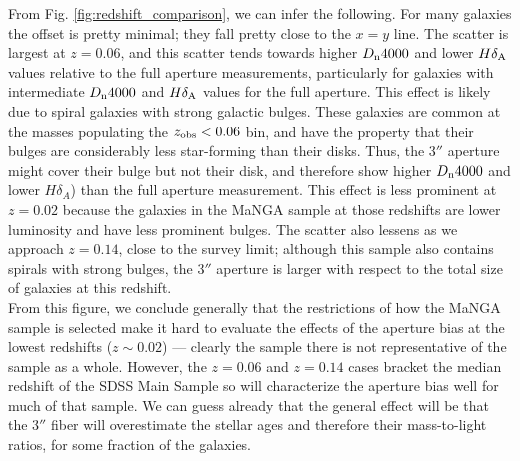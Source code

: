 From Fig. \ref{fig:redshift_comparison}, we can infer the following. For 
many galaxies the offset is pretty minimal; they fall pretty close 
to the $x=y$ line. The scatter is largest at $z = 0.06$, and this scatter
tends towards higher $D_{\rm n}4000$ and lower $H\delta_{\rm A}$ values 
relative to the full aperture measurements, particularly for galaxies with
intermediate $D_{\rm n}4000$ and $H\delta_{\rm A}$ values for the full
aperture. This effect is likely due to spiral galaxies with strong galactic
bulges. These galaxies are common at the masses populating the $z_{\rm obs} < 0.06$
bin, and have the property that their bulges are considerably less star-forming
than their disks. Thus, the 3$''$ aperture might cover their bulge but not their
disk, and therefore show higher $D_{\rm n} 4000$ and lower $H\delta_{A}$) than
the full aperture measurement. This effect is less prominent at $z=0.02$ because
the galaxies in the MaNGA sample at those redshifts are lower luminosity and 
have less prominent bulges. The scatter also lessens as we approach $z = 0.14$, 
close to the survey limit; although this sample also contains spirals with
strong bulges,  the 3$''$ aperture is larger with respect to the total size
of galaxies at this redshift.\\

From this figure, we conclude generally that the restrictions of
how the MaNGA sample is selected make it hard to evaluate the effects 
of the aperture bias at the lowest redshifts ($z\sim 0.02$) --- 
clearly the sample there is not representative of the sample as a whole.
However, the $z=0.06$ and $z=0.14$ cases bracket the median redshift of the 
SDSS Main Sample so will characterize the aperture bias well for much
of that sample. We can guess already that the general effect will be that
the $3''$ fiber will overestimate the stellar ages and therefore their 
mass-to-light ratios, for some fraction of the galaxies.

